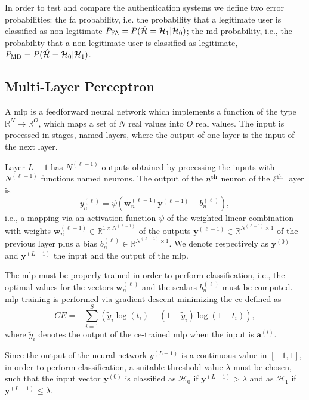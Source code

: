\documentclass[twocolumns]{IEEEtran}
\begin{document}
In order to test and compare the authentication systems we define two error probabilities: the \ac{fa} probability, i.e. the probability  that a legitimate user is classified as non-legitimate $P_{\rm FA} =P(\hat{\mathcal H} = \mathcal H_1 | \mathcal H_0)$; the \ac{md} probability, i.e., the probability that a non-legitimate user is classified as legitimate, $P_{\rm MD}=P(\hat{\mathcal H} = \mathcal H_0 | \mathcal H_1)$.

\subsection{Multi-Layer Perceptron}\label{sec:nn}

A \ac{mlp} is a feedforward neural network which implements a function of the type $\mathbb{R}^N \to \mathbb{R}^O$, which maps a set of $N$ real values into $O$ real values. The input is processed in stages, named layers, where the output of one layer is the input of the next layer.

Layer $L-1$ has $N^{(\ell-1)}$ outputs obtained by processing the inputs with $N^{(\ell-1)}$ functions named neurons. The output of the $n^{\rm th}$ neuron of the $\ell^{\rm th}$ layer is
\begin{equation}\label{eq:nonLin}
y_n^{(\ell)} = \psi\left( \bm{w}_n^{(\ell -1)}\bm{y}^{(\ell-1)}+b_n^{(\ell)} \right),
\end{equation}
i.e., a mapping via an activation function $\psi$ of the weighted linear combination with weights $\bm{w}_n^{(\ell -1)}\in \mathbb{R}^{1\times N^{(\ell-1)}}$ of the outputs $\bm{y}^{(\ell-1)} \in \mathbb{R}^{N^{(\ell-1)} \times 1 }$ of the previous layer plus a bias $b_n^{(\ell)} \in \mathbb{R}^{N^{(\ell-1)} \times 1 }$. We denote respectively as $\bm{y}^{(0)}$ and $\bm{y}^{(L-1)}$ the input and the output of the \ac{mlp}. 

The \ac{mlp} must be properly trained in order to perform classification, i.e., the optimal values for the vectors $\bm{w}_n^{(\ell)}$ and the scalars $b_n^{(\ell)}$ must be computed. \Ac{mlp} training is performed via gradient descent minimizing the \ac{ce} defined as
\begin{equation}\label{eq:ce}
CE = -\sum_{i=1}^{S}\left(\tilde{y}_i\log\left(t_i\right)+\left(1-\tilde{y}_i\right)\log\left(1-t_i\right) \right),
\end{equation}
where $\tilde{y}_i$ denotes the output of the \ac{ce}-trained \ac {mlp} when the input is $\bm{a}^{(i)}$.

Since the output of the neural network $y^{(L-1)}$ is a continuous value in $[-1,1]$, in order to perform classification, a suitable threshold value $\lambda$ must be chosen, such that the input vector $\bm{y}^{(0)}$ is classified as
$\mathcal{H}_0$ if $\bm{y}^{(L-1)} > \lambda$ and as $\mathcal{H}_1$ if $\bm{y}^{(L-1)} \le \lambda$.
\end{document}

